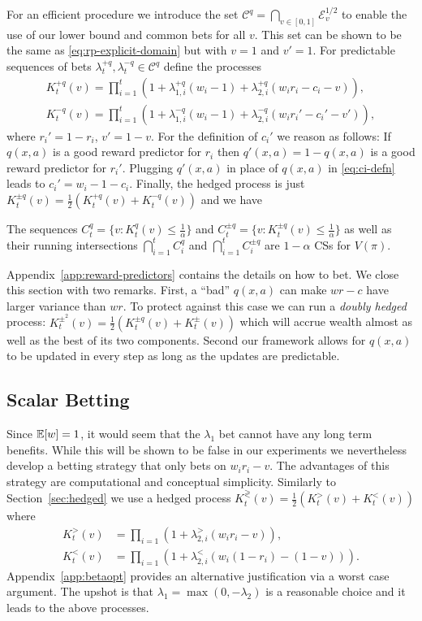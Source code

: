 For an efficient procedure we introduce the set 
$\mathcal{C}^q=\bigcap_{v \in [0,1]}\mathcal{E}_v^{1/2}$
to enable the use of our lower bound and common bets for all $v$.
This set can be shown to be the same as \eqref{eq:rp-explicit-domain}
but with $v=1$ and $v'=1$. For predictable sequences of 
bets $\lambda_{t}^{+q},\lambda_{t}^{-q}\in \mathcal{C}^q$ 
define the processes
\begin{align*}
K_t^{+q}(v) = \prod_{i=1}^{t}\left(1+\lambda_{1,i}^{+q} (w_i-1)+\lambda_{2,i}^{+q}(w_i r_i-c_i-v)\right),    \\
K_t^{-q}(v) = \prod_{i=1}^{t}\left(1+\lambda_{1,i}^{-q} (w_i-1)+\lambda_{2,i}^{-q} (w_i r_i'-c_i'-v')\right), 
\end{align*}
where $r_i'=1-r_i$, $v'=1-v$. For the definition of
$c_i'$ we reason as follows: If $q(x,a)$ is a good reward predictor
for $r_i$ then $q'(x,a)=1-q(x,a)$ is a good reward predictor for $r_i'$. 
Plugging $q'(x,a)$ in place of $q(x,a)$ in \eqref{eq:ci-defn} leads 
to $c_i' = w_i - 1 - c_i$. Finally, the hedged process is just
$
K_t^{\pm q}(v)=\frac{1}{2} (K_t^{+q}(v)+K_t^{-q}(v))
$
and we have
\begin{theorem}
\label{thm:reward-predictor}
The sequences $C_t^{q} = \{v:K_t^{q}(v)\leq \frac{1}{\alpha}\}$ and 
$C_t^{\pm q} = \{v:K_t^{\pm q}(v)\leq \frac{1}{\alpha}\}$ as well as
their running intersections $\bigcap_{i=1}^t C_i^{q}$ and
$\bigcap_{i=1}^t C_i^{\pm q}$ are $1-\alpha$ CSs for $V(\pi)$.
\end{theorem}
Appendix~\ref{app:reward-predictors} contains the details on how to bet.
We close this section with two remarks. First, a ``bad'' $q(x,a)$ can
make $wr-c$ have larger variance than $wr$. To protect against this case
we can run a \emph{doubly hedged} process: 
$K_{t}^{\pm^2}(v)=\frac{1}{2}
(K_{t}^{\pm q}(v)+K_{t}^{\pm}(v))$
which will accrue wealth almost as well as the best
of its two components.
Second our framework allows for $q(x,a)$ to be updated in every step as long as the updates are predictable. 

\subsection{Scalar Betting}
\label{sec:scalar}
Since $\mathbb{E}[w]=1$, it would seem that the $\lambda_1$ bet cannot have any long
term benefits. While this will be shown to be false 
in our experiments we nevertheless develop a betting strategy that only
bets on $w_i r_i -v$. The advantages of this strategy are computational 
and conceptual simplicity.
Similarly to Section~\ref{sec:hedged} we use a hedged
process $K_t^{\gtrless}(v)=\frac{1}{2}\left(K_t^{>}(v)+K_t^{<}(v)\right)$ where
\begin{align*}
K_t^{>}(v)&=\prod_{i=1} \left(1+\lambda_{2,i}^{>} (w_i r_i -v)\right),\\
K_t^{<}(v)&=\prod_{i=1} \left(1+\lambda_{2,i}^{<} \left(w_i (1-r_i) -(1-v)\right)\right).
\end{align*}
Appendix~\ref{app:betaopt} provides an alternative justification via a worst
case argument.  The upshot is that $\lambda_1=\max(0,-\lambda_2)$ is a
reasonable choice and it leads to the above processes.

